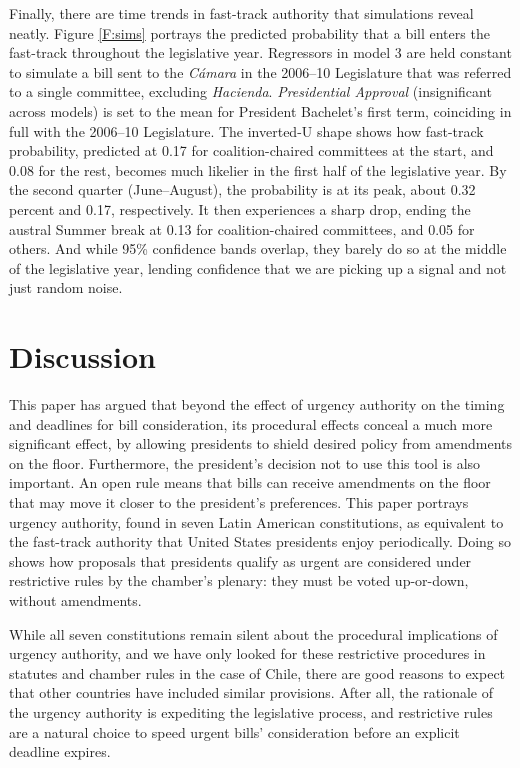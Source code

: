 \documentclass[letter,12pt]{article}
\begin{document}
Finally, there are time trends in fast-track authority that simulations reveal neatly. Figure \ref{F:sims} portrays the predicted probability that a bill enters the fast-track throughout the legislative year. Regressors in model 3 are held constant to simulate a bill sent to the \emph{Cámara} in the 2006--10 Legislature that was referred to a single committee, excluding \emph{Hacienda}. \emph{Presidential Approval} (insignificant across models) is set to the mean for President Bachelet's first term, coinciding in full with the 2006--10 Legislature. The inverted-U shape shows how fast-track probability, predicted at 0.17 for coalition-chaired committees at the start, and 0.08 for the rest, becomes much likelier in the first half of the legislative year. By the second quarter (June--August), the probability is at its peak, about 0.32 percent and 0.17, respectively. It then experiences a sharp drop, ending the austral Summer break at 0.13 for coalition-chaired committees, and 0.05 for others. And while 95\% confidence bands overlap, they barely do so at the middle of the legislative year, lending confidence that we are picking up a signal and not just random noise. 

\section*{Discussion}\label{s:discussion}

This paper has argued that beyond the effect of urgency authority on the timing and deadlines for bill consideration, its procedural effects conceal a much more significant effect, by allowing presidents to shield desired policy from amendments on the floor. Furthermore, the president's decision not to use this tool is also important. An open rule means that bills can receive amendments on the floor that may move it closer to the president's preferences. This paper portrays urgency authority, found in seven Latin American constitutions, as equivalent to the fast-track authority that United States presidents enjoy periodically. Doing so shows how proposals that presidents qualify as urgent are considered under restrictive rules by the chamber's plenary: they must be voted up-or-down, without amendments.

While all seven constitutions remain silent about the procedural implications of urgency authority, and we have only looked for these restrictive procedures in statutes and chamber rules in the case of Chile, there are good reasons to expect that other countries have included similar provisions. After all, the rationale of the urgency authority is expediting the legislative process, and restrictive rules are a natural choice to speed urgent bills' consideration before an explicit deadline expires. 
\end{document}
